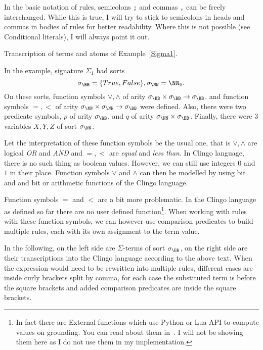 In the basic notation of rules, semicolons \texttt{;} and commas \texttt{,}
can be freely interchanged. While this is true, I will try to stick to semicolons in heads
and commas in bodies of rules for better readability.
Where this is not possible (see Conditional literals), I will always point it out.

\begin{example}\label{exp:transcription_clingo}%
    Transcription of terms and atoms of Example~\ref{Sigma1}.

    In the example, signature $\Sigma_1$ had sorts
    \begin{equation*}
        \sigma_\BB = \{True, False\}, \sigma_\NN = \NN_0.
    \end{equation*}
    On these sorts, function symbols $\vee, \wedge$ of arity
    $\sigma_\BB\times \sigma_\BB\to \sigma_\BB$,
    and function symbols $=, <$ of arity $\sigma_\NN\times\sigma_\NN\to \sigma_\BB$
    were defined.
    Also, there were two predicate symbols, $p$ of arity $\sigma_\BB$,
    and $q$ of arity $\sigma_\NN\times\sigma_\BB$.
    Finally, there were 3 variables $X, Y, Z$ of sort $\sigma_\NN$.

    Let the interpretation of these function symbols be the usual one,
    that is $\vee, \wedge$ are logical \textit{OR} and \textit{AND}
    and $=, <$ are \textit{equal} and \textit{less than}.
    In Clingo language, there is no such thing as boolean values. However, we can still use
    integers $0$ and $1$ in their place. Function symbols $\vee$ and $\wedge$
    can then be modelled by using bit and and bit or arithmetic functions of the Clingo language.

    Function symbols $=$ and $<$ are a bit more problematic.
    In the Clingo language as defined so far there are no user defined function\footnote{
        In fact there are External functions which use Python or Lua API
        to compute values on grounding.
        You can read about them in~\cite{gebser2019potassco}.
        I will not be showing them here as I do not use them in my implementation.
    }.
    When working with rules with these function symbols, we can however use
    comparison predicates to build multiple rules, each with its own assignment
    to the term value.

    In the following, on the left side are $\Sigma$-terms of sort $\sigma_\BB$,
    on the right side are their transcriptions into the Clingo language according to
    the above text. %
	When the expression would need to be rewritten into multiple rules,
    different cases are inside curly brackets split by comma, for each case the substituted term
    is before the square brackets and added comparison predicates are inside the square brackets.


\end{example}
